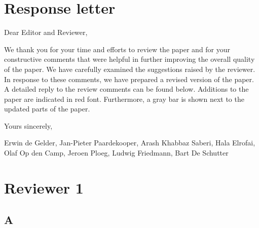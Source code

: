 \documentclass[10pt,final,a4paper,oneside,onecolumn]{article}
\newcommand{\toauthor}{\paragraph*{Comment to authors:} \itshape}
\newcommand{\fromauthor}{\paragraph*{Reply:} \normalfont}
\newcommand{\cstart}{\cbstart\color{red}}
\newcommand{\cend}{\cbend\color{black}}
\begin{document}
	
\section*{Response letter}

Dear Editor and Reviewer,

We thank you for your time and efforts to review the paper and for your constructive comments that were helpful in further improving the overall quality of the paper. We have carefully examined the suggestions raised by the reviewer. In response to these comments, we have prepared a revised version of the paper. A detailed reply to the review comments can be found below.  Additions to the paper are indicated in \cstart red \cend font. Furthermore, a gray bar is shown next to the updated parts of the paper.

Yours sincerely,

Erwin de Gelder, Jan-Pieter Paardekooper, Arash Khabbaz Saberi, Hala Elrofai, Olaf Op den Camp, Jeroen Ploeg, Ludwig Friedmann, Bart De Schutter


	
\section*{Reviewer 1}

\subsection*{A}

%
\end{document}
